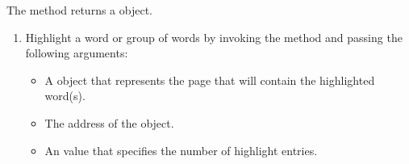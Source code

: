 \documentclass[letterpaper,12pt,english,openany,oneside]{sphinxmanual}
\begin{document}
The  method returns a  object.
\begin{enumerate}
%
\item {} 
Highlight a word or group of words by invoking the  method and passing the following arguments:
\begin{itemize}
\item {} 
A  object that represents the page that will contain the highlighted word(s).

\item {} 
The address of the  object.

\item {} 
An  value that specifies the number of highlight entries.

\end{itemize}

\end{enumerate}
\end{document}
